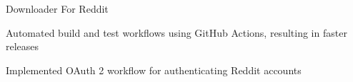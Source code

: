 

\begin{cventries}

  \cventry
    {Downloader For Reddit} %
    {} %
    {} %
    {} %
    {
      \begin{cvitems} %
        \item {Automated build and test workflows using GitHub Actions, resulting in faster releases}
        \item {Implemented OAuth 2 workflow for authenticating Reddit accounts}
      \end{cvitems}
    }


\end{cventries}
